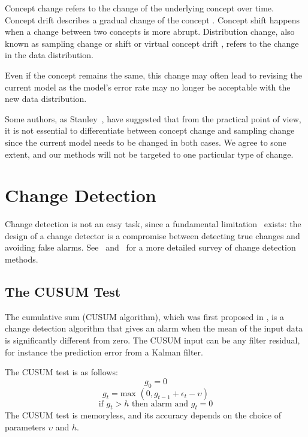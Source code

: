 Concept change refers to the change of the underlying concept over time.
Concept drift describes a gradual change of the concept .
 Concept shift happens when a change between two concepts is more abrupt. 
Distribution change, also known as sampling
change or shift or virtual concept drift , refers to the change in the data distribution.

Even if the concept remains the same, this change may often lead to revising the
current model as the model's error rate may no longer be acceptable with the
new data distribution.

Some authors, as Stanley~\cite{stanley03learning}, have suggested that from the practical point of view, it is not
essential to differentiate between concept change and sampling change since the
current model needs to be changed in both cases.
We agree to sone extent, and our methods will not be targeted to one particular type of change.

\section{Change Detection}

Change detection is not an easy task, since a fundamental
limitation~\cite{Gustaffson:2000} exists: the design of a change detector
is a compromise between detecting true changes and avoiding false
alarms. 
See~\cite{Gustaffson:2000} and~\cite{Baseville93} for a more detailed survey of change detection methods.

\subsection{The CUSUM Test}
\label{Sscusum}

The cumulative sum (CUSUM algorithm), which was first proposed in \cite{Page54}, 
is a change detection algorithm that gives an alarm when the mean of the input data is significantly 
different from zero. The CUSUM input can be any filter residual, for instance 
the prediction error from a Kalman filter.

The CUSUM test is as follows:
$$g_0=0$$
$$g_t=\mbox{max }(0,g_{t-1}+ \epsilon_t -\upsilon)$$
$$\mbox{if } g_t>h \mbox{ then alarm and } g_t=0$$
%
The CUSUM test is memoryless, and its accuracy depends on the choice of parameters $\upsilon$ and $h$.


